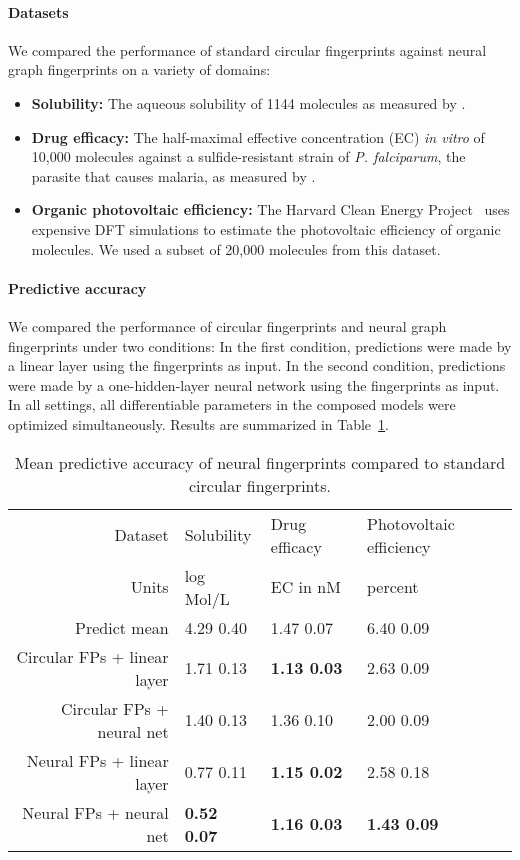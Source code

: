 \documentclass{article}
\newcommand{\citet}{\cite}
\begin{document}
\paragraph{Datasets}
We compared the performance of standard circular fingerprints against neural graph fingerprints on a variety of domains:
\begin{itemize}
\item {\bf Solubility:} The aqueous solubility of 1144 molecules as measured by \cite{delaney_data_2004}.
\item{\bf Drug efficacy:} The half-maximal effective concentration (EC) {\it in vitro} of 10,000 molecules against a sulfide-resistant strain of {\it P. falciparum}, the parasite that causes malaria, as measured by \citet{gamo2010thousands}.
\item {\bf Organic photovoltaic efficiency:} The Harvard Clean Energy Project~\citet{hachmann2011harvard} uses expensive DFT simulations to estimate the photovoltaic efficiency of organic molecules.
We used a subset of 20,000 molecules from this dataset.
\end{itemize}


\paragraph{Predictive accuracy}
We compared the performance of circular fingerprints and neural graph fingerprints under two conditions:
In the first condition, predictions were made by a linear layer using the fingerprints as input.
In the second condition, predictions were made by a one-hidden-layer neural network using the fingerprints as input.
In all settings, all differentiable parameters in the composed models were optimized simultaneously.
Results are summarized in Table~\ref{table:main results}.
\begin{table}
\begin{center}
\begin{tabular}{r|lll}
Dataset                      &   Solubility \citet{delaney_data_2004} & Drug efficacy \citet{gamo2010thousands} & Photovoltaic efficiency \citet{hachmann2011harvard} \\
Units                        &   log Mol/L                            & EC in nM                        & percent \\
\midrule
Predict mean                 & 4.29  0.40        & 1.47  0.07         & 6.40  0.09 \\
Circular FPs + linear layer  & 1.71  0.13        & \bf{1.13}  0.03    & 2.63  0.09 \\
Circular FPs + neural net    & 1.40  0.13        & 1.36  0.10         & 2.00  0.09 \\ 
Neural FPs + linear layer    & 0.77  0.11        & \bf{1.15}  0.02    & 2.58  0.18 \\  
Neural FPs + neural net      & \bf{0.52}  0.07   & \bf{1.16}  0.03    & \bf{1.43}  0.09
\end{tabular}
\label{table:main results}
\caption{Mean predictive accuracy of neural fingerprints compared to standard circular fingerprints.}
\end{center}
\end{table}
\end{document}

